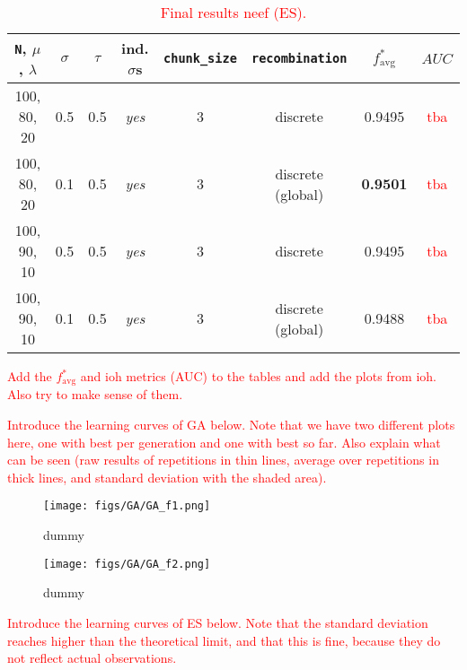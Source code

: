 \documentclass{article}
\newcommand{\todo}[1]{\textcolor{red}{#1}}
\begin{document}
\begin{table}[htbp]
    \centering
    \begin{tabular}{cccccc|cc}
        \toprule
        \texttt{N}, $\mu$, $\lambda$ & $\sigma$ & $\tau$ & ind. $\sigma$s & \texttt{chunk\_size} & \texttt{recombination}
            & $f^*_{\mathrm{avg}}$ & $AUC$ \\ %
        \midrule
        100, 80, 20  &  0.5  &  0.5  &  \textit{yes}  &  3  & discrete           &  0.9495           &  \todo{tba}  \\
        100, 80, 20  &  0.1  &  0.5  &  \textit{yes}  &  3  & discrete (global)  &  \textbf{0.9501}  &  \todo{tba}  \\
        100, 90, 10  &  0.5  &  0.5  &  \textit{yes}  &  3  & discrete           &  0.9495           &  \todo{tba}  \\
        100, 90, 10  &  0.1  &  0.5  &  \textit{yes}  &  3  & discrete (global)  &  0.9488           &  \todo{tba}  \\
        \bottomrule
    \end{tabular}
    \vspace{0.1cm}
    \caption{\todo{Final results neef (ES).}}
    \label{tab:ES_final_configs}
\end{table}


\todo{Add the $f^*_{\mathrm{avg}}$ and ioh metrics (AUC) to the tables and add the plots from ioh. Also try to make sense of them.}


\todo{Introduce the learning curves of GA below. Note that we have two different plots here, one with best per generation and one with best so far. Also explain what can be seen (raw results of repetitions in thin lines, average over repetitions in thick lines, and standard deviation with the shaded area).}

\begin{figure*}[htbp]
    \centering
    \texttt{[image: figs/GA/GA\_f1.png]}
    \captionsetup{width=.75\textwidth}
    \caption{dummy}
    \label{fig:GA_f1}
\end{figure*}

\begin{figure*}[htbp]
    \centering
    \texttt{[image: figs/GA/GA\_f2.png]}
    \captionsetup{width=.75\textwidth}
    \caption{dummy}
    \label{fig:GA_f2}
\end{figure*}

\newpage

\todo{Introduce the learning curves of ES below. Note that the standard deviation reaches higher than the theoretical limit, and that this is fine, because they do not reflect actual observations.}
\end{document}
